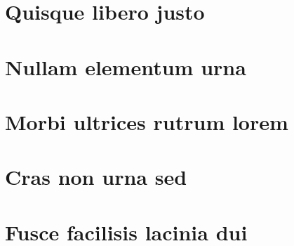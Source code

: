 \documentclass[
	12pt,				%
	openright,			%
	oneside,			%
	a4paper,			%
	chapter=TITLE,		%
	english,			%
	french,				%
	spanish,			%
	brazil				%
	]{abntex2}
\theoremstyle{definition}
\begin{document}
\begin{apendicesenv}
	
	\partapendices
	
\chapter{Quisque libero justo}

\lipsum[50]

\chapter{Nullam elementum urna}
\lipsum[55-57]
	
\end{apendicesenv}


\begin{anexosenv}
	
	\partanexos
	
    \chapter{Morbi ultrices rutrum lorem}
    \lipsum[30]

    \chapter{Cras non urna sed}

    \lipsum[31]

    \chapter{Fusce facilisis lacinia dui}

    \lipsum[32]
	
\end{anexosenv}
\end{document}
